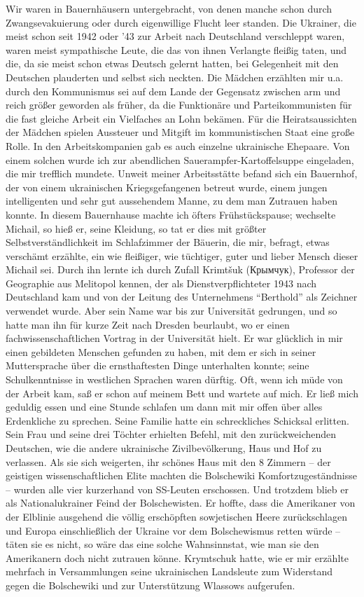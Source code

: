 \documentclass[a5paper,pagesize,10pt,twoside=true]{scrbook}
\newcommand\textcyr[1]{{\fontencoding{OT2}\fontfamily{wncyr}\selectfont #1}}	%
\renewcommand{\marginpar}[2][]{}
\begin{document}
\marginpar{63} Wir waren in Bauernhäusern untergebracht, von denen manche schon durch Zwangsevakuierung oder durch eigenwillige Flucht leer standen. Die Ukrainer, die meist schon seit 1942 oder '43 zur Arbeit nach Deutschland verschleppt waren, waren meist sympathische Leute, die das von ihnen Verlangte fleißig taten, und die, da sie meist schon etwas Deutsch gelernt hatten, bei Gelegenheit mit den Deutschen plauderten und selbst sich neckten. Die Mädchen erzählten mir u.a. durch den Kommunismus sei auf dem Lande der Gegensatz zwischen arm und reich größer geworden als früher, da die Funktionäre und Parteikommunisten für die fast gleiche Arbeit ein Vielfaches an Lohn bekämen. Für die Heiratsaussichten der Mädchen spielen Aussteuer und Mitgift im kommunistischen Staat eine große Rolle. In den Arbeitskompanien gab es auch einzelne ukrainische Ehepaare. Von einem solchen wurde ich zur abendlichen Sauerampfer-Kartoffelsuppe eingeladen, die mir trefflich mundete. Unweit meiner Arbeitsstätte befand sich ein Bauernhof, der von einem ukrainischen Kriegsgefangenen betreut wurde, einem \marginpar{64} jungen intelligenten und sehr gut aussehendem Manne, zu dem man Zutrauen haben konnte. In diesem Bauernhause machte ich öfters Frühstückspause; wechselte Michail, so hieß er, seine Kleidung, so tat er dies mit größter Selbstverständlichkeit im Schlafzimmer der Bäuerin, die mir, befragt, etwas verschämt erzählte, ein wie fleißiger, wie tüchtiger, guter und lieber Mensch dieser Michail sei. Durch ihn lernte ich durch Zufall Krimtšuk (\textcyr{Крымчук}), Professor der Geographie aus Melitopol kennen, der als Dienstverpflichteter 1943 nach Deutschland kam und von der Leitung des Unternehmens \enquote{Berthold} als Zeichner verwendet wurde. Aber sein Name war bis zur Universität gedrungen, und so hatte man ihn für kurze Zeit nach Dresden beurlaubt, wo er einen fachwissenschaftlichen Vortrag in der Universität hielt. Er war glücklich in mir einen gebildeten Menschen gefunden zu haben, mit dem er sich in seiner Muttersprache über die ernsthaftesten Dinge unterhalten konnte; seine Schulkenntnisse in westlichen Sprachen waren dürftig. Oft, wenn ich müde von der Arbeit kam, saß er schon auf meinem Bett und wartete auf mich. Er ließ mich geduldig essen und eine Stunde schlafen um dann mit mir offen über alles Erdenkliche zu sprechen. Seine Familie hatte ein schreckliches Schicksal erlitten. Sein \marginpar{65} Frau und seine drei Töchter erhielten Befehl, mit den zurückweichenden Deutschen, wie die andere ukrainische Zivilbevölkerung, Haus und Hof zu verlassen. Als sie sich weigerten, ihr schönes Haus mit den 8 Zimmern -- der geistigen wissenschaftlichen Elite machten die Bolschewiki Komfortzugeständnisse -- wurden alle vier kurzerhand von SS-Leuten erschossen. Und trotzdem blieb er als Nationalukrainer Feind der Bolschewisten. Er hoffte, dass die Amerikaner von der Elblinie ausgehend die völlig erschöpften sowjetischen Heere zurückschlagen und Europa einschließlich der Ukraine vor dem Bolschewismus retten würde -- täten sie es nicht, so wäre das eine solche Wahnsinnstat, wie man sie den Amerikanern doch nicht zutrauen könne. Krymtschuk hatte, wie er mir erzählte mehrfach in Versammlungen seine ukrainischen Landsleute zum Widerstand gegen die Bolschewiki und zur Unterstützung Wlassows aufgerufen.
\end{document}
